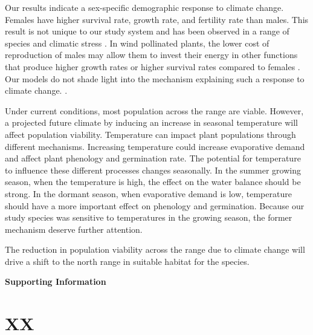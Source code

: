 \documentclass[12pt]{article}
\begin{document}
Our results indicate a sex-specific demographic response to climate change. 
Females have higher survival rate, growth rate, and fertility rate than males. 
This result is not unique to our study system and has been observed in a range of species and climatic stress \citep{welbergen2008climate,zhao2012sex,sasaki2019complex}. 
In wind pollinated plants, the lower cost of reproduction of males may allow them to invest their energy in other functions that produce higher growth rates or higher survival rates compared to females \citep{burli2022environmental,hultine2016climate,cipollini1994sexual,field2013comparative}.
Our models do not shade light into the mechanism explaining such a response to climate change.
{\color{blue}{We proposed XXXXXXXXX}}. 

Under current conditions, most population across the range are viable.
However, a projected future climate by inducing an increase in seasonal temperature will affect population viability. 
Temperature can impact plant populations through different mechanisms. 
Increasing temperature could increase evaporative demand and affect plant phenology and germination rate. 
The potential for temperature to influence these different processes changes seasonally. 
In the summer growing season, when the temperature is high, the effect on the water balance should be strong.
In the dormant season, when evaporative demand is low, temperature should have a more important effect on phenology and germination. Because our study species was sensitive to temperatures in the growing season, the former mechanism deserve further attention. 




The reduction in population viability across the range due to climate change will drive a shift to the north range in suitable habitat for the species. 


\newpage


\newpage
\clearpage 
\setcounter{equation}{0}
\setcounter{figure}{0}
\setcounter{section}{0}
\setcounter{table}{0}
\renewcommand{\theequation}{S.\arabic{equation}}
\renewcommand{\thetable}{S-\arabic{table}}
\renewcommand{\thefigure}{S-\arabic{figure}}
\renewcommand{\thesection}{S.\arabic{section}}

\centerline{\Large{\textbf{Supporting Information}}}

\section {XX}	
\end{document}
